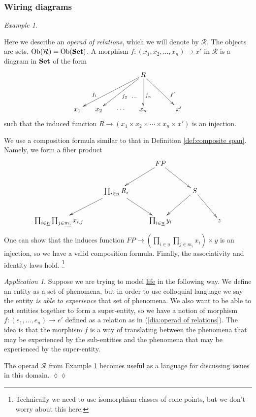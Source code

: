 \documentclass{book}
\def\tn{\textnormal}
\def\mc{\mathcal}
\def\Ob{\tn{Ob}}
\def\taking{\colon}
\def\too{\longrightarrow}
\def\ul{\underline}
\def\Set{{\bf Set}}
\def\mcR{\mc{R}}
\theoremstyle{remark}
\newtheorem{example}[subsubsection]{Example}
\newtheorem{app}[subsubsection]{Application}
\newenvironment{application}{\begin{app}}{\hspace*{\fill}$\lozenge\lozenge$\end{app}}
\theoremstyle{definition}
\begin{document}

\subsubsection{Wiring diagrams}


\begin{example}\label{ex:operad of relations}

Here we describe an {\em operad of relations}, which we will denote by $\mcR$. The objects are sets, $\Ob(\mcR)=\Ob(\Set)$. A morphism $f\taking (x_1,x_2,\ldots,x_n)\too x'$ in $\mcR$ is a diagram in $\Set$ of the form 
\begin{align}\label{dia:operad of relations}
\xymatrix@=15pt{&&&R\ar[llldd]_(.7){f_1}\ar[lldd]^{f_2}\ar@{}[ldd]^(.6)\cdots\ar[dd]^(.6){f_n}\ar[rrdd]^(.7){f'}\\\\x_1&x_2&\cdots&x_n&&x'}
\end{align} 
such that the induced function $R\too(x_1\times x_2\times\cdots\times x_n\times x')$ is an injection.

We use a composition formula similar to that in Definition \ref{def:composite span}. Namely, we form a fiber product
$$\xymatrix{&&FP\ar[rd]\ar[ld]\\&\prod_{i\in\ul{n}}R_i\ar[ld]\ar[rd]&&S\ar[ld]\ar[rd]\\\prod_{i\in\ul{n}}\prod_{j\in\ul{m_i}}x_{i,j}&&\prod_{i\in\ul{n}}y_i&&z}$$
One can show that the induces function $FP\too\left(\prod_{i\in\ul{n}}\prod_{j\in\ul{m_i}}x_i\right)\times y$ is an injection, so we have a valid composition formula. Finally, the associativity and identity laws hold.
\footnote{Technically we need to use isomorphism classes of cone points, but we don't worry about this here.}

\end{example}

\begin{application}\label{app:entity by experience}
Suppose we are trying to model \href{http://en.wikipedia.org/wiki/Life}{\text life} in the following way. We define an entity as a set of phenomena, but in order to use colloquial language we say the entity {\em is able to experience} that set of phenomena. We also want to be able to put entities together to form a super-entity, so we have a notion of morphism $f\taking(e_1,\ldots,e_n)\too e'$ defined as a relation as in (\ref{dia:operad of relations}). The idea is that the morphism $f$ is a way of translating between the phenomena that may be experienced by the sub-entities and the phenomena that may be experienced by the super-entity. 

The operad $\mcR$ from Example \ref{ex:operad of relations} becomes useful as a language for discussing issues in this domain.
\end{application}
\end{document}
